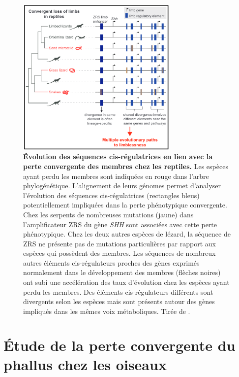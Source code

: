 \begin{figure}[hbt!]
 \centering
 \includegraphics[width=0.7\textwidth, page=1]{figures/IPLOSS/chap4_Fig_intro.png}
 \caption[Évolution des séquences \gls{cis}-régulatrices en lien avec la perte convergente des membres chez les reptiles.]{
 \textbf{Évolution des séquences \gls{cis}-régulatrices en lien avec la perte convergente des membres chez les reptiles.} Les espèces ayant perdu les membres sont indiquées en rouge dans l'arbre phylogénétique. L'alignement de leurs génomes permet d'analyser l'évolution des séquences \gls{cis}-régulatrices (rectangles bleus) potentiellement impliquées dans la perte phénotypique convergente. Chez les serpents de nombreuses mutations (jaune) dans l'\gls{amplificateur} ZRS du gène \textit{SHH} sont associées avec cette perte phénotypique. Chez les deux autres espèces de lézard, la séquence de ZRS ne présente pas de mutations particulières par rapport aux espèces qui possèdent des membres. Les séquences de nombreux autres éléments \gls{cis}-régulateurs proches des gènes exprimés normalement dans le développement des membres (flèches noires) ont subi une accélération des taux d'évolution chez les espèces ayant perdu les membres. Des éléments \gls{cis}-régulateurs différents sont divergents selon les espèces mais sont présents autour des gènes impliqués dans les mêmes voix métaboliques. Tirée de \citet{roscito_convergent_2022}.
 \\
 }
 \label{fig:chap4-fig1}
\end{figure} 

\section{\'Etude de la perte convergente du phallus chez les oiseaux}
\label{sec:evol-phallus}

